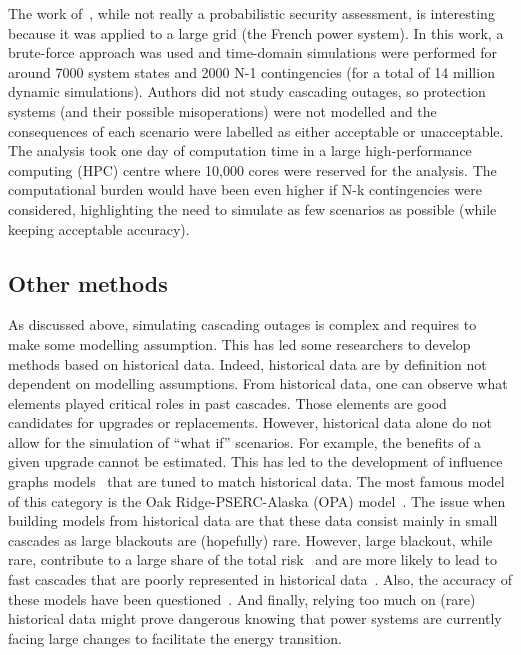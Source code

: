 The work of~\cite{EurostagHPC}, while not really a probabilistic security assessment, is interesting because it was applied to a large grid (the French power system). In this work, a brute-force approach was used and time-domain simulations were performed for around 7000 system states and 2000 N-1 contingencies (for a total of 14 million dynamic simulations). Authors did not study cascading outages, so protection systems (and their possible misoperations) were not modelled and the consequences of each scenario were labelled as either acceptable or unacceptable. The analysis took one day of computation time in a large high-performance computing (HPC) centre where 10,000 cores were reserved for the analysis. The computational burden would have been even higher if N-k contingencies were considered, highlighting the need to simulate as few scenarios as possible (while keeping acceptable accuracy).



\subsection{Other methods}
\label{sec:OtherMethods}

As discussed above, simulating cascading outages is complex and requires to make some modelling assumption. This has led some researchers to develop methods based on historical data. Indeed, historical data are by definition not dependent on modelling assumptions. From historical data, one can observe what elements played critical roles in past cascades. Those elements are good candidates for upgrades or replacements. However, historical data alone do not allow for the simulation of ``what if'' scenarios. For example, the benefits of a given upgrade cannot be estimated. This has led to the development of influence graphs models~\cite{CascadingInfluenceGraph} that are tuned to match historical data. The most famous model of this category is the Oak Ridge-PSERC-Alaska (OPA) model~\cite{OPA2019}. The issue when building models from historical data are that these data consist mainly in small cascades as large blackouts are (hopefully) rare. However, large blackout, while rare, contribute to a large share of the total risk~\cite{CascadingMethodoAndChallenges} and are more likely to lead to fast cascades that are poorly represented in historical data~\cite{cascadeAcceleration}. Also, the accuracy of these models have been questioned~\cite{TopologicalModelsBad}. And finally, relying too much on (rare) historical data might prove dangerous knowing that power systems are currently facing large changes to facilitate the energy transition.

